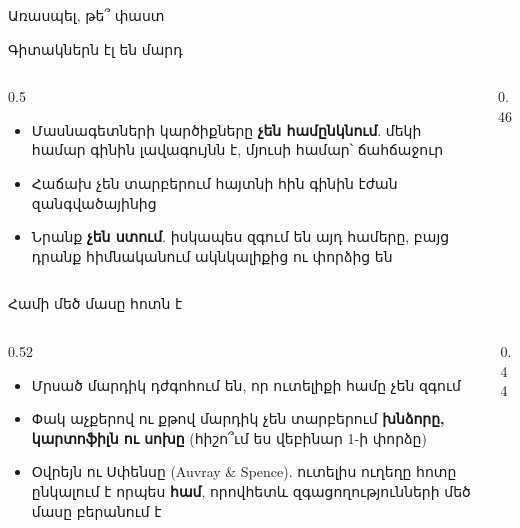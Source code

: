 \begin{frame}{Առասպել, թե՞ փաստ}
\end{frame}

\begin{frame}{Գիտակներն էլ են մարդ}
  \begin{columns}[T]
    \begin{column}{0.5\textwidth}
      \begin{itemize}
        \item Մասնագետների կարծիքները \textbf{չեն համընկնում}. մեկի համար գինին լավագույնն է, մյուսի համար՝ ճահճաջուր
        \item<2-> Հաճախ չեն տարբերում հայտնի հին գինին էժան զանգվածայինից
        \item<3-> Նրանք \textbf{չեն ստում}. իսկապես զգում են այդ համերը, բայց դրանք հիմնականում ակնկալիքից ու փորձից են
      \end{itemize}
    \end{column}
    \begin{column}{0.46\textwidth}
    \end{column}
  \end{columns}
\end{frame}

\begin{frame}{Համի մեծ մասը հոտն է}
  \begin{columns}[c]
    \begin{column}{0.52\textwidth}
      \begin{itemize}
        \item Մրսած մարդիկ դժգոհում են, որ ուտելիքի համը չեն զգում
        \item<2-> Փակ աչքերով ու քթով մարդիկ չեն տարբերում \textbf{խնձորը, կարտոֆիլն ու սոխը} {\small(հիշո՞ւմ ես վեբինար 1-ի փորձը)}
        \item<3-> Օվրեյն ու Սփենսը (Auvray \& Spence). ուտելիս ուղեղը հոտը ընկալում է որպես \textbf{համ}, որովհետև զգացողությունների մեծ մասը բերանում է
      \end{itemize}
    \end{column}
    \begin{column}{0.44\textwidth}
      \centering
      
    \end{column}
  \end{columns}
\end{frame}

